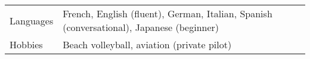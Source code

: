 
\begin{tabularx}{\linewidth}{@{}l X@{}}
Languages &  \normalsize{French, English (fluent), German, Italian, Spanish (conversational), Japanese (beginner)}\\
Hobbies &  \normalsize{Beach volleyball, aviation (private pilot)}\\  
\end{tabularx}